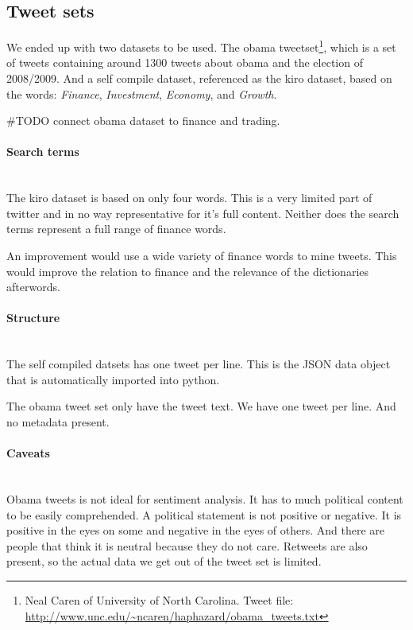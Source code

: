 \subsection{Tweet sets}
We ended up with two datasets to be used. The obama tweetset\footnote{Neal
Caren of University of North Carolina. Tweet file: \url{http://www.unc.edu/~ncaren/haphazard/obama_tweets.txt}}, which is a set of
tweets containing around 1300 tweets about obama and the election of 2008/2009.  
And a self compile dataset, referenced as the kiro dataset, based on the words: \textit{Finance},
\textit{Investment}, \textit{Economy}, and \textit{Growth}.

#TODO connect obama dataset to finance and trading.

\paragraph{Search terms}
\hspace{0pt}\\
The kiro dataset is based on only four words. This is a very limited part of
twitter and in no way representative for it's full content. Neither does the
search terms represent a full range of finance words.

An improvement would use a wide variety of finance words to mine tweets. This
would improve the relation to finance and the relevance of the dictionaries
afterwords. 

\paragraph{Structure}
\hspace{0pt}\\
The self compiled datsets has one tweet per line. This is the JSON data object
that is automatically imported into python. 

The obama tweet set only have the tweet text. We have one tweet per line. And
no metadata present. 

\paragraph{Caveats}
\hspace{0pt}\\
Obama tweets is not ideal for sentiment analysis. It has to much political
content to be easily comprehended. A political statement is not positive or
negative. It is positive in the eyes on some and negative in the eyes of others.
And there are people that think it is neutral because they do not care. Retweets
are also present, so the actual data we get out of the tweet set is limited. 

